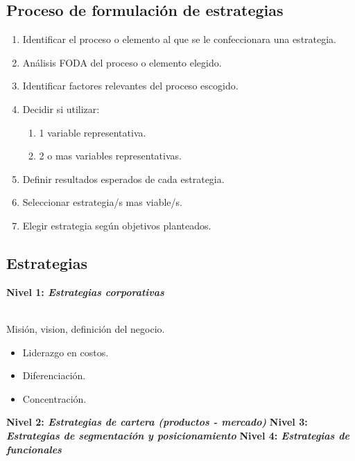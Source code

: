\documentclass{templateNote}
\begin{document}
\subsection{Proceso de formulación de estrategias}
\begin{enumerate}
    \item Identificar el proceso o elemento al que se le confeccionara una estrategia.
    
    \item Análisis FODA del proceso o elemento elegido.
    
    \item Identificar factores relevantes del proceso escogido.
    
    \item Decidir si utilizar:
    \begin{enumerate}
        \item 1 variable representativa.
        
        \item 2 o mas variables representativas.
    \end{enumerate}
    
    \item Definir resultados esperados de cada estrategia.
    
    \item Seleccionar estrategia/s mas viable/s.
    
    \item Elegir estrategia según objetivos planteados.
\end{enumerate}

\subsection{Estrategias}
\hypertarget{estrategia_corporativa}{\noindent\textbf{Nivel 1: \textit{Estrategias corporativas}}} \\
\indent Misión, vision, definición del negocio.
\begin{itemize}
    \item Liderazgo en costos.
    
    \item Diferenciación.
    
    \item Concentración.
\end{itemize}
\textbf{Nivel 2: \textit{Estrategias de cartera (productos - mercado)}} \newline
\textbf{Nivel 3: \textit{Estrategias de segmentación y posicionamiento}} \newline
\textbf{Nivel 4: \textit{Estrategias de funcionales}}
\end{document}
